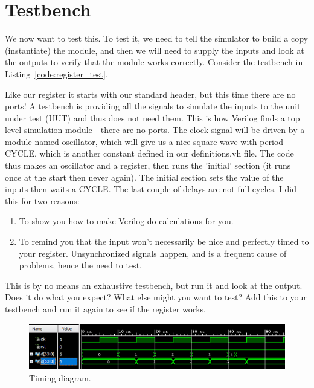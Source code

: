 \section{Testbench}

We now want to test this.  To test it, we need to tell the simulator to build a copy (instantiate) the module, and then we will need to supply the inputs and look at the outputs to verify that the module works correctly.  Consider the testbench in Listing~\ref{code:register_test}.


Like our register it starts with our standard header, but this time there are no ports!  A testbench is providing all the signals to simulate the inputs to the unit under test (UUT) and thus does not need them.  This is how Verilog finds a top level simulation module - there are no ports.  The clock signal will be driven by a module named oscillator, which will give us a nice square wave with period CYCLE, which is another constant defined in our definitions.vh file.  The code thus makes an oscillator and a register, then runs the 'initial' section (it runs once at the start then never again).  The initial section sets the value of the inputs then waits a CYCLE.  The last couple of delays are not full cycles.  I did this for two reasons:
\begin{enumerate}
\item To show you how to make Verilog do calculations for you.
\item To remind you that the input won't necessarily be nice and perfectly timed to your register.  Unsynchronized signals happen, and is a frequent cause of problems, hence the need to test.
\end{enumerate}
This is by no means an exhaustive testbench, but run it and look at the output.  Does it do what you expect?  What else might you want to test?  Add this to your testbench and run it again to see if the register works.



\begin{figure}
\caption{Timing diagram.}\label{fig:registertiming}
\begin{center}
\includegraphics[width=4.75in]{../images/register_test_timing_diagram.png}
\end{center}
\end{figure}

